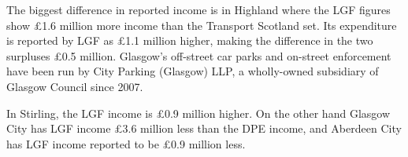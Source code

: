 \documentclass[
  12pt,
]{article}
\begin{document}
The biggest difference in reported income is in Highland where the LGF figures show £1.6 million more income than the Transport Scotland set. Its expenditure is reported by LGF as £1.1 million higher, making the difference in the two surpluses £0.5 million. Glasgow's off-street car parks and on-street enforcement have been run by City Parking (Glasgow) LLP, a wholly-owned subsidiary of Glasgow Council since 2007.

In Stirling, the LGF income is £0.9 million higher. On the other hand Glasgow City has LGF income £3.6 million less than the DPE income, and Aberdeen City has LGF income reported to be £0.9 million less.

\newpage
\begin{landscape}
\begin{table}[H]


\end{table}
\end{landscape}
\end{document}
